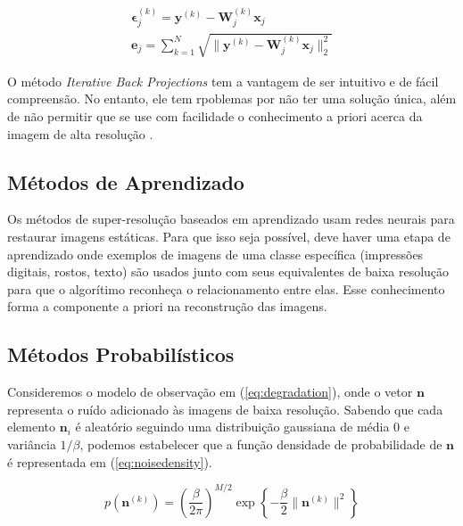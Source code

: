 \begin{gather}
	\label{eq:ibperror1} \mathbf{\epsilon}^{(k)}_j = \mathbf{y}^{(k)}-\mathbf{W}^{(k)}_j \mathbf{x}_j \\
	\label{eq:ibperrorsum} \mathbf{e}_j = \sum^N_{k=1}{\sqrt{\|\mathbf{y}^{(k)}-\mathbf{W}^{(k)}_j \mathbf{x}_j\|^2_2}}
\end{gather}

O método \emph{Iterative Back Projections} tem a vantagem de ser intuitivo e de fácil compreensão.
No entanto, ele tem rpoblemas por não ter uma solução única, além de não permitir que se use com facilidade o conhecimento a priori acerca da imagem de alta resolução \cite{nasrollahi2014super, park2003super}.


\subsection{Métodos de Aprendizado}
Os métodos de super-resolução baseados em aprendizado usam redes neurais para restaurar imagens estáticas.
Para que isso seja possível, deve haver uma etapa de aprendizado onde exemplos de imagens de uma classe específica (impressões digitais, rostos, texto) são usados junto com seus equivalentes de baixa resolução para que o algorítimo reconheça o relacionamento entre elas.
Esse conhecimento forma a componente a priori na reconstrução das imagens.

\subsection{\label{sec:metodosprob}Métodos Probabilísticos}

Consideremos o modelo de observação em (\ref{eq:degradation}), onde o vetor
$\mathbf{n}$ representa o ruído adicionado às imagens de baixa resolução.
Sabendo que cada elemento $\mathbf{n}_i$ é aleatório seguindo uma distribuição
gaussiana de média 0 e variância $1/\beta$, podemos estabelecer que a função
densidade de probabilidade de $\mathbf{n}$ é representada em (\ref{eq:noisedensity}).

\begin{equation}
	\label{eq:noisedensity}
	p(\mathbf{n}^{(k)}) = \left(\frac{ \beta}{2\pi} \right)^{M/2}
	\exp{\left\{  -  \frac{\beta}{2}\|\mathbf{n}^{(k)}\|^2 \right\}}
\end{equation}

